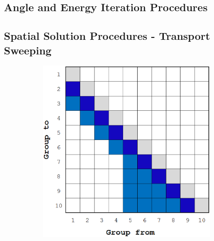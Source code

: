 \subsection{Angle and Energy Iteration Procedures}
\label{sec::Sn_Solution_Iterative}

\subsection{Spatial Solution Procedures - Transport Sweeping}
\label{sec::Sn_Solution_Spatial}

\begin{figure}
\centering
	\begin{subfigure}[b]{0.58\textwidth}
		\centering
		\includegraphics[width=\textwidth]{figures/sec_Sn/scattering_matrix_NO_upscattering.eps}
		\vspace{4mm}
	\end{subfigure}
	\hfill
	\begin{subfigure}[b]{0.58\textwidth}
		\centering

\end{subfigure}
\end{figure}
